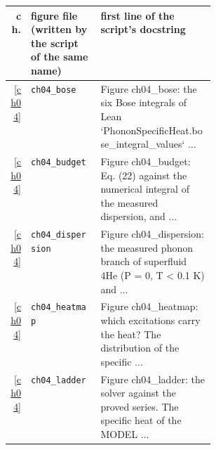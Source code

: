 \begin{center}\footnotesize\setlength{\tabcolsep}{3pt}\begin{tabularx}{\linewidth}{@{}r>{\raggedright}p{0.34\linewidth}>{\raggedright\arraybackslash}X@{}}\toprule ch. & figure file (written by the script of the same name) & first line of the script's docstring\\\midrule
\ref{ch04} & \texttt{ch04\_\allowbreak{}bose} & Figure ch04\_\allowbreak{}bose: the six Bose integrals of Lean `PhononSpecificHeat.\allowbreak{}bose\_\allowbreak{}integral\_\allowbreak{}values` .\allowbreak{}.\allowbreak{}.\allowbreak{} \\
\ref{ch04} & \texttt{ch04\_\allowbreak{}budget} & Figure ch04\_\allowbreak{}budget: Eq.\allowbreak{} (22) against the numerical integral of the measured dispersion,\allowbreak{} and .\allowbreak{}.\allowbreak{}.\allowbreak{} \\
\ref{ch04} & \texttt{ch04\_\allowbreak{}dispersion} & Figure ch04\_\allowbreak{}dispersion: the measured phonon branch of superfluid 4He (P = 0,\allowbreak{} T < 0.\allowbreak{}1 K) and .\allowbreak{}.\allowbreak{}.\allowbreak{} \\
\ref{ch04} & \texttt{ch04\_\allowbreak{}heatmap} & Figure ch04\_\allowbreak{}heatmap: which excitations carry the heat?  The distribution of the specific .\allowbreak{}.\allowbreak{}.\allowbreak{} \\
\ref{ch04} & \texttt{ch04\_\allowbreak{}ladder} & Figure ch04\_\allowbreak{}ladder: the solver against the proved series.\allowbreak{}  The specific heat of the MODEL .\allowbreak{}.\allowbreak{}.\allowbreak{} \\
\bottomrule\end{tabularx}\end{center}

